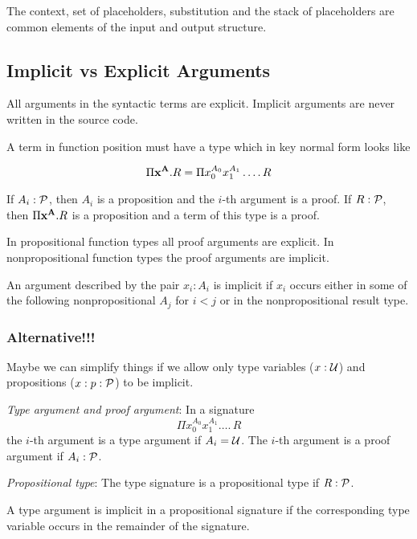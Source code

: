 The context, set of placeholders, substitution and the stack of placeholders
are common elements of the input and output structure.




\subsection{Implicit vs Explicit Arguments}

All arguments in the syntactic terms are explicit. Implicit arguments are
never written in the source code.

A term in function position must have a type which in key normal form looks
like

$$
\Pi \mathbf{x}^{\mathbf{A}} . R = \Pi x_0^{A_0} x_1^{A_1} \ldots .\, R
$$

If $A_i:{\cal{P}}$, then $A_i$ is a proposition and the $i$-th argument is a
proof. If $R:{\cal{P}}$, then $\Pi \mathbf{x}^{\mathbf{A}}. R$ is a proposition and a term
of this type is a proof.

In propositional function types all proof arguments are explicit. In
nonpropositional function types the proof arguments are implicit.

An argument described by the pair $x_i: A_i$ is implicit if $x_i$ occurs
either in some of the following nonpropositional $A_j$ for $i < j$ or in the
nonpropositional result type.



\subsubsection{Alternative!!!}

Maybe we can simplify things if we allow only type variables ($x:{\cal{U}}$)
and propositions ($x : p : {\cal{P}}$) to be implicit.

\begin{definition}
  \emph{Type argument and proof argument}: In a signature
  $$\Pi x_0^{A_0} x_1^{A_1} \ldots .\, R$$
  the $i$-th argument is a type argument if $A_i = {\cal{U}}$. The $i$-th argument
  is a proof argument if $A_i:{\cal{P}}$.

  \emph{Propositional type}: The type signature is a propositional type if
  $R:{\cal{P}}$.

\end{definition}


A type argument is implicit in a propositional signature if the corresponding
type variable occurs in the remainder of the signature.

